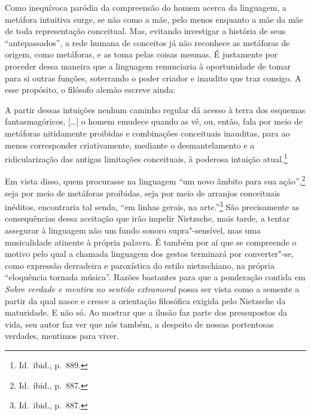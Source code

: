 Como inequívoca paródia da compreensão do homem acerca da linguagem, a
metáfora intuitiva surge, se não como a mãe, pelo menos enquanto a mãe
da mãe de toda representação conceitual. Mas, evitando investigar a
história de seus “antepassados”, a rede humana de conceitos já não
reconhece as metáforas de origem, como metáforas, e as toma pelas
coisas mesmas. É justamente por proceder dessa maneira que a linguagem
renunciaria à oportunidade de tomar para si outras funções, soterrando
o poder criador e inaudito que traz consigo. A esse propósito, o
filósofo alemão escreve ainda: 

\begin{hedraquote}
A partir dessas intuições nenhum
caminho regular dá acesso à terra dos esquemas fantasmagóricos, [\ldots{}]
o homem emudece quando as vê, ou, então, fala por meio 
de metáforas nitidamente proibidas e combinações conceituais inauditas,
para ao menos corresponder criativamente, mediante o desmantelamento e
a ridicularização das antigas limitações conceituais, à poderosa
intuição atual.\footnote{ Id.~ibid., p.~889.}
\end{hedraquote}

Em vista disso, quem procurasse na linguagem “um novo âmbito para sua
ação'',\footnote{ Id.~ibid., p.~887.} seja por meio de
metáforas proibidas, seja por meio de arranjos conceituais inéditos,
encontraria tal senda, ``em linhas gerais, na
arte.”\footnote{ Id.~ibid., p.~887.} São precisamente as consequências
dessa aceitação que irão impelir Nietzsche, mais tarde, a tentar assegurar
à linguagem não um fundo sonoro supra"-sensível, mas uma musicalidade
atinente à própria palavra. É também por aí que se compreende o motivo
pelo qual a chamada linguagem dos gestos terminará por converter"-se,
como expressão derradeira e paroxística do estilo nietzschiano, na
própria “eloquência tornada música”. Razões bastantes para que a
ponderação contida em \textit{Sobre verdade e mentira no sentido
extramoral } possa ser vista como a semente a partir da qual nasce e
cresce a orientação filosófica exigida pelo Nietzsche da maturidade. E
não só. Ao mostrar que a ilusão faz parte dos pressupostos da vida, seu
autor faz ver que nós também, a despeito de nossas portentosas
verdades, mentimos para viver.
